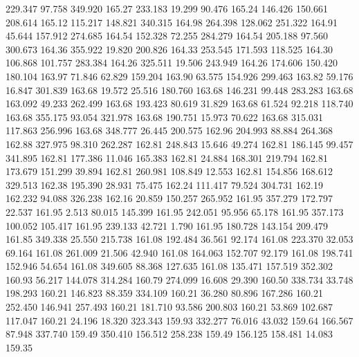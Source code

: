  229.347   97.758  349.920       165.27
 233.183   19.299   90.476       165.24
 146.426  150.661  208.614       165.12
 115.217  148.821  340.315       164.98
 264.398  128.062  251.322       164.91
  45.644  157.912  274.685       164.54
 152.328   72.255  284.279       164.54
 205.188   97.560  300.673       164.36
 355.922   19.820  200.826       164.33
 253.545  171.593  118.525       164.30
 106.868  101.757  283.384       164.26
 325.511   19.506  243.949       164.26
 174.606  150.420  180.104       163.97
  71.846   62.829  159.204       163.90
  63.575  154.926  299.463       163.82
  59.176   16.847  301.839       163.68
  19.572   25.516  180.760       163.68
 146.231   99.448  283.283       163.68
 163.092   49.233  262.499       163.68
 193.423   80.619   31.829       163.68
  61.524   92.218  118.740       163.68
 355.175   93.054  321.978       163.68
 190.751   15.973   70.622       163.68
 315.031  117.863  256.996       163.68
 348.777   26.445  200.575       162.96
 204.993   88.884  264.368       162.88
 327.975   98.310  262.287       162.81
 248.843   15.646   49.274       162.81
 186.145   99.457  341.895       162.81
 177.386   11.046  165.383       162.81
  24.884  168.301  219.794       162.81
 173.679  151.299   39.894       162.81
 260.981  108.849   12.553       162.81
 154.856  168.612  329.513       162.38
 195.390   28.931   75.475       162.24
 111.417   79.524  304.731       162.19
 162.232   94.088  326.238       162.16
  20.859  150.257  265.952       161.95
 357.279  172.797   22.537       161.95
   2.513   80.015  145.399       161.95
 242.051   95.956   65.178       161.95
 357.173  100.052  105.417       161.95
 239.133   42.721    1.790       161.95
 180.728  143.154  209.479       161.85
 349.338   25.550  215.738       161.08
 192.484   36.561   92.174       161.08
 223.370   32.053   69.164       161.08
 261.009   21.506   42.940       161.08
 164.063  152.707   92.179       161.08
 198.741  152.946   54.654       161.08
 349.605   88.368  127.635       161.08
 135.471  157.519  352.302       160.93
  56.217  144.078  314.284       160.79
 274.099   16.608   29.390       160.50
 338.734   33.748  198.293       160.21
 146.823   88.359  334.109       160.21
  36.280   80.896  167.286       160.21
 252.450  146.941  257.493       160.21
 181.710   93.586  200.803       160.21
  53.869  102.687  117.047       160.21
  24.196   18.320  323.343       159.93
 332.277   76.016   43.032       159.64
 166.567   87.948  337.740       159.49
 350.410  156.512  258.238       159.49
 156.125  158.481   14.083       159.35
